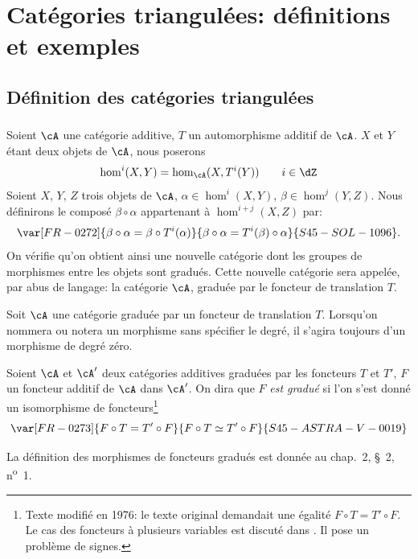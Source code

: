 \section{Catégories triangulées: définitions et exemples}\label{VIII:1}





\subsection{Définition des catégories triangulées}\label{VIII:1-1}


\addtocounter{subsubsection}{-1}
\subsubsection{}\label{VIII:1-1-0}

Soient $\cA$ une catégorie additive, $T$ un automorphisme additif de $\cA$. 
$X$ et $Y$ étant deux objets de $\cA$, nous poserons 
\[
  \hom^i(X,Y) = \hom_\cA(X,T^i(Y)) \qquad i\in \dZ 
\]
Soient $X$, $Y$, $Z$ trois objets de $\cA$, $\alpha\in \hom^i(X,Y)$, 
$\beta\in \hom^j(Y,Z)$. Nous définirons le composé $\beta\circ\alpha$ 
appartenant à $\hom^{i+j}(X,Z)$ par: 
\[
  \var[FR-0272]{\beta\circ \alpha = \beta\circ T^i(\alpha)}{\beta\circ \alpha = T^i(\beta)\circ\alpha}{S45-SOL-1096} \text{.}
\]
On vérifie qu'on obtient ainsi une nouvelle catégorie dont les groupes de 
morphismes entre les objets sont gradués. Cette nouvelle catégorie sera 
appelée, par abus de langage: la catégorie $\cA$, graduée par le foncteur 
de translation $T$. 

Soit $\cA$ une catégorie graduée par un foncteur de translation $T$. 
Lorsqu'on nommera ou notera un morphisme sans spécifier le degré, il 
s'agira toujours d'un morphisme de degré zéro. 

Soient $\cA$ et $\cA'$ deux catégories additives graduées par les foncteurs
$T$ et $T'$, $F$ un foncteur additif de $\cA$ dans $\cA'$. On dira que $F$ 
\emph{est gradué} si l'on s'est donné un isomorphisme de 
foncteurs\footnote{Texte modifié en 1976: le texte original demandait une 
égalité $F\circ T=T'\circ F$. Le cas des foncteurs à plusieurs variables 
est discuté dans . Il pose un problème de signes.} 
\[
  \var[FR-0273]{F\circ T = T'\circ F}{F\circ T \simeq T'\circ F}{S45-ASTRA-V-0019} 
\]

La définition des morphismes de foncteurs gradués est donnée au 
chap.~2, \S~2, n\textsuperscript{o}~1. 

